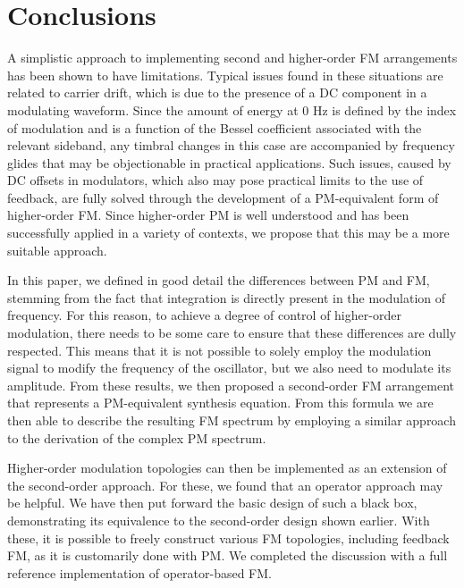 \documentclass[]{interact}
\begin{document}
\section{Conclusions}\label{sec:conclusions}

A simplistic approach to implementing second and higher-order FM arrangements has been shown to have limitations. Typical issues found in these situations are related to carrier drift, which is due to the presence of a DC component in a modulating waveform. Since the amount of energy at 0 Hz is defined by the index of modulation and is a function of the Bessel coefficient associated with the relevant sideband, any timbral changes in this case are accompanied by frequency glides that may be objectionable in practical applications. Such issues, caused by DC offsets in modulators, which also may pose practical limits to the use of feedback, are fully solved through the development of a PM-equivalent form of higher-order FM. Since higher-order PM is well understood and has been successfully applied in a variety of contexts, we propose that this may be a more suitable approach.

In this paper, we defined in good detail the differences between PM and FM, stemming from the fact that integration is directly present in the modulation of frequency. For this reason, to achieve a degree of control of higher-order modulation, there needs to be some care to ensure that these differences are dully respected. This means that it is not possible to solely employ the modulation signal to modify the frequency of the oscillator, but we also need to modulate its amplitude. From these
results, we then proposed a second-order FM arrangement that represents a PM-equivalent synthesis equation. From this formula we are then able to describe the resulting FM spectrum by employing a similar approach to the derivation of the complex PM spectrum. 

Higher-order modulation topologies can then be implemented as an extension of the second-order approach. 
For these, we found that an operator approach may be helpful. We have then put forward the basic design of such a black box, demonstrating its equivalence to the second-order design shown earlier. With these, it is possible to freely construct various FM topologies, including feedback FM, as it is customarily done with PM. We completed the discussion with a full reference implementation of operator-based FM.
\end{document}
